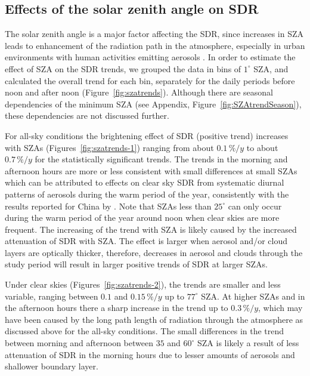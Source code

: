 \documentclass[applsci,article,submit,moreauthors,pdftex]{Definitions/mdpi}
\begin{document}
\hypertarget{effects-of-the-solar-zenith-angle-on-sdr}{%
\subsection{Effects of the solar zenith angle on
SDR}\label{effects-of-the-solar-zenith-angle-on-sdr}}

The solar zenith angle is a major factor affecting the SDR, since
increases in SZA leads to enhancement of the radiation path in the
atmosphere, especially in urban environments with human activities
emitting aerosols \citep{Wang2021}. In order to estimate the effect of
SZA on the SDR trends, we grouped the data in bins of \(1^\circ\) SZA,
and calculated the overall trend for each bin, separately for the daily
periods before noon and after noon (Figure~\ref{fig:szatrends}).
Although there are seasonal dependencies of the minimum SZA (see
Appendix, Figure~\ref{fig:SZAtrendSeason}), these dependencies are not
discussed further.

For all-sky conditions the brightening effect of SDR (positive trend)
increases with SZAs (Figures~\ref{fig:szatrends-1}) ranging from about
\(0.1\,\%/y\) to about \(0.7\,\%/y\) for the statistically significant
trends. The trends in the morning and afternoon hours are more or less
consistent with small differences at small SZAs which can be attributed
to effects on clear sky SDR from systematic diurnal patterns of aerosols
during the warm period of the year, consistently with the results
reported for China by \citet{Wang2021}. Note that SZAs less than
\(25^\circ\) can only occur during the warm period of the year around
noon when clear skies are more frequent. The increasing of the trend
with SZA is likely caused by the increased attenuation of SDR with SZA.
The effect is larger when aerosol and/or cloud layers are optically
thicker, therefore, decreases in aerosol and clouds through the study
period will result in larger positive trends of SDR at larger SZAs.

Under clear skies (Figures~\ref{fig:szatrends-2}), the trends are
smaller and less variable, ranging between \(0.1\) and \(0.15\,\%/y\) up
to \(77^\circ\) SZA. At higher SZAs and in the afternoon hours there a
sharp increase in the trend up to \(0.3\,\%/y\), which may have been
caused by the long path length of radiation through the atmosphere as
discussed above for the all-sky conditions. The small differences in the
trend between morning and afternoon between \(35\) and \(60^\circ\) SZA
is likely a result of less attenuation of SDR in the morning hours due
to lesser amounts of aerosols and shallower boundary layer.
\end{document}
